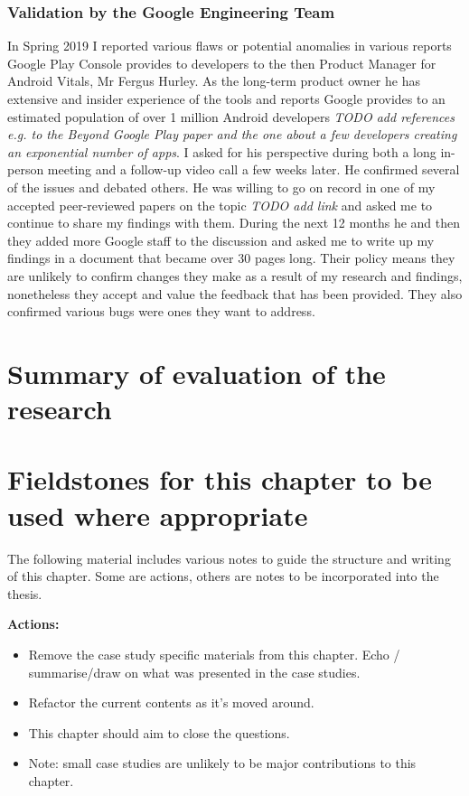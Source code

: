 \subsubsection{Validation by the Google Engineering Team}
In Spring 2019 I reported various flaws or potential anomalies in various reports Google Play Console provides to developers to the then Product Manager for Android Vitals, Mr Fergus Hurley. As the long-term product owner he has extensive and insider experience of the tools and reports Google provides to an estimated population of over 1 million Android developers \emph{TODO add references e.g. to the Beyond Google Play paper and the one about a few developers creating an exponential number of apps}. I asked for his perspective during both a long in-person meeting and a follow-up video call a few weeks later. He confirmed several of the issues and debated others. He was willing to go on record in one of my accepted peer-reviewed papers on the topic \emph{TODO add link} and asked me to continue to share my findings with them. During the next 12 months he and then they added more Google staff to the discussion and asked me to write up my findings in a document that became over 30 pages long. Their policy means they are unlikely to confirm changes they make as a result of my research and findings, nonetheless they accept and value the feedback that has been provided. They also confirmed various bugs were ones they want to address.


\section{Summary of evaluation of the research}


\section{Fieldstones for this chapter to be used where appropriate}
The following material includes various notes to guide the structure and writing of this chapter. Some are actions, others are notes to be incorporated into the thesis. 

\textbf{Actions:} 
\begin{itemize}
    \item Remove the case study specific materials from this chapter. Echo / summarise/draw on what was presented in the case studies. 
    \item Refactor the current contents as it's moved around.
    \item This chapter should aim to close the questions. 
    \item Note: small case studies are unlikely to be major contributions to this chapter.
\end{itemize}



